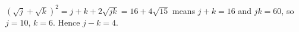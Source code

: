 $(\sqrt j+\sqrt k)^2=j+k+2\sqrt{jk}=16+4\sqrt{15}$ means $j+k=16$ and $jk=60$, so $j=10$, $k=6$. Hence $j-k=\boxed{4}$.
